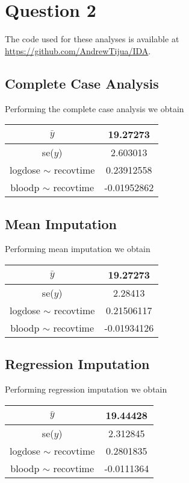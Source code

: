 \documentclass[11pt]{article}
\begin{document}
\section{Question 2}

The code used for these analyses is available at \url{https://github.com/AndrewTijua/IDA}.

\subsection*{Complete Case Analysis}

Performing the complete case analysis we obtain 

\begin{table}[H]
\centering
\begin{tabular}{|c|c|}
	\hline 
	$\bar{y}$ & 19.27273\\ 
	\hline 
	se($y$) & 2.603013\\ 
	\hline 
	logdose $\sim$ recovtime & 0.23912558\\ 
	\hline 
	bloodp $\sim$ recovtime & -0.01952862\\ 
	\hline 
\end{tabular} 
\end{table}

\subsection*{Mean Imputation}

Performing mean imputation we obtain 

\begin{table}[H]
	\centering
	\begin{tabular}{|c|c|}
		\hline 
		$\bar{y}$ & 19.27273\\ 
		\hline 
		se($y$) & 2.28413\\ 
		\hline 
		logdose $\sim$ recovtime & 0.21506117\\ 
		\hline 
		bloodp $\sim$ recovtime & -0.01934126\\ 
		\hline 
	\end{tabular} 
\end{table}

\subsection*{Regression Imputation}

Performing regression imputation we obtain 

\begin{table}[H]
	\centering
	\begin{tabular}{|c|c|}
		\hline 
		$\bar{y}$ & 19.44428\\ 
		\hline 
		se($y$) & 2.312845\\ 
		\hline 
		logdose $\sim$ recovtime & 0.2801835\\ 
		\hline 
		bloodp $\sim$ recovtime & -0.0111364\\ 
		\hline 
	\end{tabular} 
\end{table}
\end{document}
